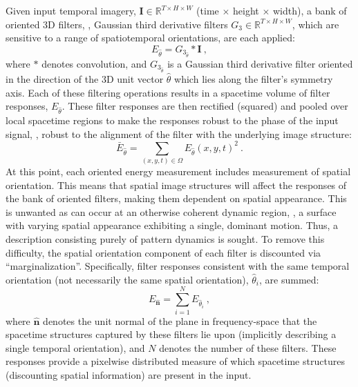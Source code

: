 Given input temporal imagery, $\mathbf{I} \in \mathbb{R}^{T \times H \times W}$ (time $\times$ height $\times$ width), a bank of oriented 3D
filters, \eg, Gaussian third derivative filters $G_3 \in \mathbb{R}^{T \times H \times W}$, which are sensitive to a range of
spatiotemporal orientations, are each applied:
\begin{equation}
	E_{\hat{\theta}} = G_{3_{\hat{\theta}}} \ast \mathbf{I}\ ,
\end{equation}
where $\ast$ denotes convolution, and $G_{3_{\hat{\theta}}}$ is a Gaussian third derivative filter oriented in the direction of the 3D unit vector $\hat{\theta}$ which lies along the filter's symmetry axis. Each of these filtering operations results in a spacetime volume of filter responses, $E_{\hat{\theta}}$.
These filter responses are then rectified (squared) and
pooled over local spacetime regions to make the responses robust
to the phase of the input signal, \ie, robust to the
alignment of the filter with the underlying image
structure:
\begin{equation}
	\bar{E}_{\hat{\theta}} = \sum_{(x, y, t) \in \Omega}{{E_{\hat{\theta}}(x, y, t)}^2}\ .
\end{equation}
At this point, each oriented energy measurement includes measurement of spatial orientation. This means that spatial image structures will affect the responses of the bank of oriented filters, making them dependent on spatial appearance. This  is unwanted as  can occur at an otherwise coherent dynamic region, \eg, a surface with varying spatial appearance exhibiting a single, dominant motion. Thus, a description consisting purely of pattern dynamics is sought.
To remove this difficulty, the spatial orientation component of each filter is discounted via ``marginalization''. Specifically, filter responses consistent with the same temporal orientation (not necessarily the same spatial orientation), $\hat{\theta}_i$, are summed:
\begin{equation}
	E_{\hat{\mathbf{n}}} = \sum_{i = 1}^{N}{E_{\hat{\theta}_i}}\ ,
	\label{eq:oriented_filter_2.8}
\end{equation}
where $\hat{\mathbf{n}}$ denotes the unit normal of the plane in frequency-space that the spacetime structures captured by these filters lie upon (implicitly describing a single temporal orientation), and $N$ denotes the number of these filters.
These responses provide a pixelwise distributed measure
of which spacetime structures (discounting spatial information) are
present in the input.
